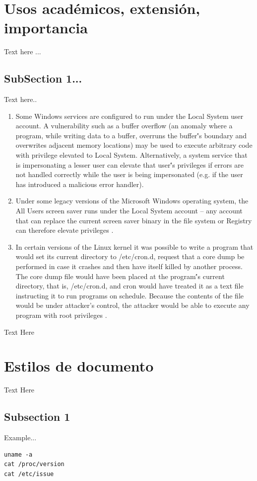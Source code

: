 \documentclass[letterpaper, 10pt, journal]{IEEEtran}
\begin{document}
\section{Usos acad\'emicos, extensi\'on, importancia}
Text here ...

\subsection{SubSection 1...}
Text here..
\begin{enumerate}
\item	Some Windows services are configured to run under the Local System user account. A vulnerability such as a buffer overflow (an anomaly where a program, while writing data to a buffer, overruns the buffer\''s boundary and overwrites adjacent memory locations) may be used to execute arbitrary code with privilege elevated to Local System. Alternatively, a system service that is impersonating a lesser user can elevate that user\''s privileges if errors are not handled correctly while the user is being impersonated (e.g. if the user has introduced a malicious error handler)\cite{[6]}.
\item	Under some legacy versions of the Microsoft Windows operating system, the All Users screen saver runs under the Local System account – any account that can replace the current screen saver binary in the file system or Registry can therefore elevate privileges \cite{[6]}.
\item	In certain versions of the Linux kernel it was possible to write a program that would set its current directory to /etc/cron.d, request that a core dump be performed in case it crashes and then have itself killed by another process. The core dump file would have been placed at the program\''s current directory, that is, /etc/cron.d, and cron would have treated it as a text file instructing it to run programs on schedule. Because the contents of the file would be under attacker’s control, the attacker would be able to execute any program with root privileges \cite{[3]}.
\end{enumerate}
Text Here

\section{Estilos de documento}
Text Here
\subsection{Subsection 1}
Example...
\lstset{language=Java}
\begin{lstlisting}
uname -a
cat /proc/version
cat /etc/issue
\end{lstlisting}
\end{document}
